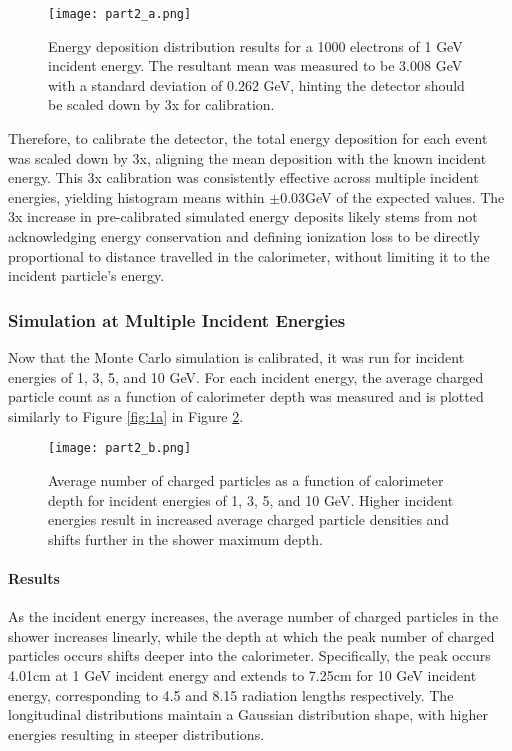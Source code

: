 \documentclass[twocolumn]{aastex631}
\begin{document}
\begin{figure}[htp]
  \centering
    \texttt{[image: part2\_a.png]}
    \caption{Energy deposition distribution results for a 1000 electrons of 1 GeV
        incident energy. The resultant mean was measured to be 3.008 GeV with a
        standard deviation of 0.262 GeV, hinting the detector should be scaled down by 3x
    for calibration.} 
    \label{fig:2a}
\end{figure}

Therefore, to calibrate the detector, the total energy deposition for each event
was scaled down by 3x, aligning the mean deposition with the known incident
energy. This 3x calibration was consistently effective across multiple incident
energies, yielding histogram means within $\pm 0.03$GeV of the expected values.
The 3x increase in pre-calibrated simulated energy deposits likely stems from
not acknowledging energy conservation and defining ionization loss to be
directly proportional to distance travelled in the calorimeter, without limiting
it to the incident particle's energy. 

\subsubsection{Simulation at Multiple Incident Energies} 

Now that the Monte Carlo simulation is calibrated, it was run for incident
energies of 1, 3, 5, and 10 GeV. For each incident energy, the average charged
particle count as a function of calorimeter depth was measured and is plotted
similarly to Figure \ref{fig:1a} in Figure \ref{fig:2b}. 

\begin{figure}[htp]
  \centering
    \texttt{[image: part2\_b.png]}
    \caption{Average number of charged particles as a function of calorimeter
        depth for incident energies of 1, 3, 5, and 10 GeV. Higher incident energies result in
        increased average charged particle densities and shifts further in the shower
    maximum depth.}
    \label{fig:2b}
\end{figure}

\paragraph{Results} As the incident energy increases, the average number of
charged particles in the shower increases linearly, while the depth at which
the peak number of charged particles occurs shifts deeper into the
calorimeter. Specifically, the peak occurs 4.01cm at 1 GeV incident energy and
extends to 7.25cm for 10 GeV incident energy, corresponding to 4.5 and 8.15
radiation lengths respectively. The longitudinal distributions maintain a
Gaussian distribution shape, with higher energies resulting in steeper
distributions. 
\end{document}
